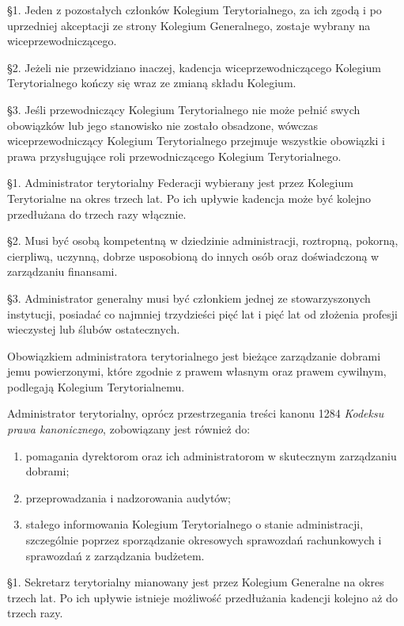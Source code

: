  \S{}1. Jeden z pozostałych członków Kolegium Terytorialnego, za ich zgodą i po uprzedniej akceptacji ze strony Kolegium Generalnego, zostaje wybrany na wiceprzewodniczącego.

\S{}2. Jeżeli nie przewidziano inaczej, kadencja wiceprzewodniczącego Kolegium Terytorialnego kończy się wraz ze zmianą składu Kolegium.

\S{}3. Jeśli przewodniczący Kolegium Terytorialnego nie może pełnić swych obowiązków lub jego stanowisko nie zostało obsadzone, wówczas wiceprzewodniczący Kolegium Terytorialnego przejmuje wszystkie obowiązki i prawa przysługujące roli przewodniczącego Kolegium Terytorialnego.


 \S{}1. Administrator terytorialny Federacji wybierany jest przez Kolegium Terytorialne na okres trzech lat. Po ich upływie kadencja może być kolejno przedłużana do trzech razy włącznie.

\S{}2. Musi być osobą kompetentną w dziedzinie administracji, roztropną, pokorną, cierpliwą, uczynną, dobrze usposobioną do innych osób oraz doświadczoną w zarządzaniu finansami.

\S{}3. Administrator generalny musi być członkiem jednej ze stowarzyszonych instytucji, posiadać co najmniej trzydzieści pięć lat i pięć lat od złożenia profesji wieczystej lub ślubów ostatecznych.


 Obowiązkiem administratora terytorialnego jest bieżące zarządzanie dobrami jemu powierzonymi, które zgodnie z prawem własnym oraz prawem cywilnym, podlegają Kolegium Terytorialnemu.

 Administrator terytorialny, oprócz przestrzegania treści kanonu 1284 {\em Kodeksu prawa kanonicznego}, zobowiązany jest również do:
\begin{enumerate}
	\item pomagania dyrektorom oraz ich administratorom w skutecznym zarządzaniu dobrami;
	\item przeprowadzania i nadzorowania audytów;
	\item stałego informowania Kolegium Terytorialnego o stanie administracji, szczególnie poprzez sporządzanie okresowych sprawozdań rachunkowych i sprawozdań z zarządzania budżetem.
\end{enumerate}


 \S{}1. Sekretarz terytorialny mianowany jest przez Kolegium Generalne na okres trzech lat. Po ich upływie istnieje możliwość przedłużania kadencji kolejno aż do trzech razy.

